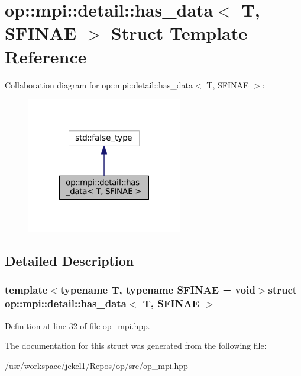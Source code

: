 \hypertarget{structop_1_1mpi_1_1detail_1_1has__data}{\section{op\-:\-:mpi\-:\-:detail\-:\-:has\-\_\-data$<$ T, S\-F\-I\-N\-A\-E $>$ Struct Template Reference}
\label{structop_1_1mpi_1_1detail_1_1has__data}
}


Collaboration diagram for op\-:\-:mpi\-:\-:detail\-:\-:has\-\_\-data$<$ T, S\-F\-I\-N\-A\-E $>$\-:
\nopagebreak
\begin{figure}[H]
\begin{center}
\leavevmode
\includegraphics[width=192pt]{structop_1_1mpi_1_1detail_1_1has__data__coll__graph}
\end{center}
\end{figure}


\subsection{Detailed Description}
\subsubsection*{template$<$typename T, typename S\-F\-I\-N\-A\-E = void$>$struct op\-::mpi\-::detail\-::has\-\_\-data$<$ T, S\-F\-I\-N\-A\-E $>$}



Definition at line 32 of file op\-\_\-mpi.\-hpp.



The documentation for this struct was generated from the following file\-:\begin{DoxyCompactItemize}
\item 
/usr/workspace/jekel1/\-Repos/op/src/op\-\_\-mpi.\-hpp\end{DoxyCompactItemize}
